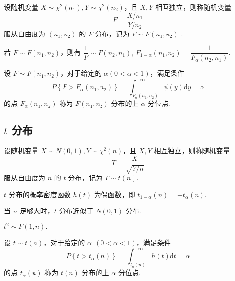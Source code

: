 \begin{definition}[$F$ 分布]
    设随机变量 $ X \sim \chi^{2}\left(n_{1}\right), Y \sim \chi^{2}\left(n_{2}\right)$，且 $ X, Y $ 相互独立，则称随机变量
    $$F=\frac{X / n_{1}}{Y / n_{2}}$$
    服从自由度为 $ \left(n_{1}, n_{2}\right) $ 的 $ F $ 分布，记为 $ F \sim F\left(n_{1}, n_{2}\right)$ .
\end{definition}

\begin{theorem}
    若 $ F \sim F\left(n_{1}, n_{2}\right) $，则有 $ \dfrac{1}{F} \sim F\left(n_{2}, n_{1}\right) ,~F_{1-\alpha}\left(n_{1}, n_{2}\right)=\dfrac{1}{F_{\alpha}\left(n_{2}, n_{1}\right)}$.
\end{theorem}

\begin{theorem}
    设 $ F \sim F\left(n_{1}, n_{2}\right) $，对于给定的 $ \alpha(0<\alpha<1) $，满足条件
    $$P\left\{F>F_{\alpha}\left(n_{1}, n_{2}\right)\right\}=\int_{F_{\alpha}\left(n_{1}, n_{2}\right)}^{+\infty} \psi(y) \mathrm{d} y=\alpha$$
    的点 $ F_{\alpha}\left(n_{1}, n_{2}\right) $ 称为 $ F\left(n_{1}, n_{2}\right) $ 分布的上 $ \alpha $ 分位点.
\end{theorem}

\subsection{\texorpdfstring{$t$}. 分布}

\begin{definition}[$t$ 分布]
    设随机变量 $ X \sim N(0,1), Y \sim \chi^{2}(n)$，且 $ X, Y $ 相互独立，则称随机变量
    $$T=\frac{X}{\sqrt{Y / n}}$$
    服从自由度为 $ n $ 的 $ t $ 分布，记为 $ T \sim t(n) .$
\end{definition}

\begin{theorem}
    $ t $ 分布的概率密度函数 $ h(t) $ 为偶函数，即 $ t_{1-\alpha}(n)=-t_{\alpha}(n) .$
\end{theorem}

\begin{theorem}
    当 $ n $ 足够大时，$t $ 分布近似于 $ N(0,1) $ 分布.
\end{theorem}
\begin{theorem}[$t$ 分布与 $F$ 分布]
    $ t^{2} \sim F(1, n) .$
\end{theorem}

\begin{definition}
    设 $ t \sim t(n) $，对于给定的 $ \alpha~~(0<\alpha<1) $，满足条件
    $$P\left\{t>t_{\alpha}(n)\right\}=\int_{t_{\alpha}(n)}^{+\infty} h(t) \mathrm{d} t=\alpha$$
    的点 $ t_{\alpha}(n) $ 称为 $ t(n) $ 分布的上 $ \alpha $ 分位点.
\end{definition}

